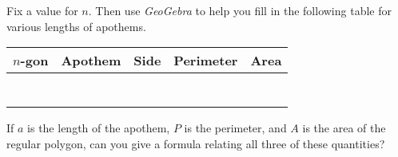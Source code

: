 \begin{prob}
Fix a value for $n$. Then use \textsl{GeoGebra} to help you fill in
the following table for various lengths of apothems.
\begin{center}
\begin{tabular}{|c||c|c|c|c|}\hline
$n$-gon & Apothem & Side & Perimeter & Area  \\\hline\hline
 \rule[0mm]{0mm}{7mm}\hspace{15mm}  &  & &  &  \\ \hline
 \rule[0mm]{0mm}{7mm}\hspace{15mm} &  & &  &  \\ \hline
 \rule[0mm]{0mm}{7mm}\hspace{15mm} &  & &  &  \\ \hline
 \rule[0mm]{0mm}{7mm}\hspace{15mm} &  & &  &  \\ \hline
 \rule[0mm]{0mm}{7mm}\hspace{15mm} &  & &  &  \\ \hline
 \rule[0mm]{0mm}{7mm}\hspace{15mm} &  & &  &  \\ \hline
 \rule[0mm]{0mm}{7mm}\hspace{15mm} &  & &  &  \\ \hline
\end{tabular}
\end{center}
\end{prob}

\begin{prob}
If $a$ is the length of the apothem, $P$ is the perimeter, and $A$ is
the area of the regular polygon, can you give a formula relating all
three of these quantities?
\end{prob}

